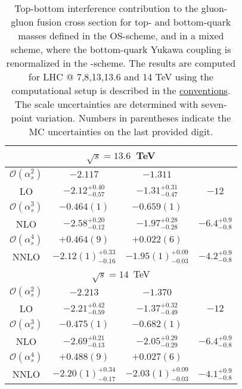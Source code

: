 \begin{table}
\begin{tabular}{cccc}
  \hline
  \hline
  \multicolumn{4}{c}{$\sqrt{s}=13.6$~TeV}\\
  \hline
  $\mathcal{O}(\alpha_s^2)$ & $-2.117$ & $-1.311$ & \\
  LO & $-2.12^{+0.40}_{-0.57}$ & $-1.31^{+0.31}_{-0.47}$ & $-12$ \\
  \hline
  $\mathcal{O}(\alpha_s^3)$ & $-0.464(1)$ & $-0.659(1)$ & \\
  NLO & $-2.58^{+0.20}_{-0.12}$ & $-1.97^{+0.28}_{-0.28}$ & $-6.4^{+0.9}_{-0.8}$ \\
  \hline
  $\mathcal{O}(\alpha_s^4)$ & $+0.464(9)$ & $+0.022(6)$ & \\
  NNLO & $-2.12(1)^{+0.33}_{-0.16}$ & $-1.95(1)^{+0.09}_{-0.03}$ & $-4.2^{+0.9}_{-0.8}$ \\
  \hline
  \hline
  \multicolumn{4}{c}{$\sqrt{s}=14$~TeV}\\
  \hline
  $\mathcal{O}(\alpha_s^2)$ & $-2.213$ & $-1.370$ & \\
  LO & $-2.21^{+0.42}_{-0.59}$ & $-1.37^{+0.32}_{-0.49}$ & $-12$ \\
  \hline
  $\mathcal{O}(\alpha_s^3)$ & $-0.475(1)$ & $-0.682(1)$ & \\
  NLO & $-2.69^{+0.21}_{-0.13}$ & $-2.05^{+0.29}_{-0.29}$ & $-6.4^{+0.9}_{-0.8}$ \\
  \hline
  $\mathcal{O}(\alpha_s^4)$ & $+0.488(9)$ & $+0.027(6)$ & \\
  NNLO & $-2.20(1)^{+0.34}_{-0.17}$ & $-2.03(1)^{+0.09}_{-0.03}$ & $-4.1^{+0.9}_{-0.8}$ \\
  \end{tabular}
  \caption{Top-bottom interference contribution to the gluon-gluon fusion cross section for top- and bottom-quark masses defined in the \acs{OS}-scheme, and in a mixed scheme, where the bottom-quark Yukawa coupling is renormalized in the \MS-scheme. The results are computed for LHC @ 7,8,13,13.6 and 14 TeV using the computational setup is described in the \hyperref[chap:notation_and_conventions]{conventions}. The scale uncertainties are determined with seven-point variation. Numbers in parentheses indicate the \acs{MC} uncertainties on the last provided digit.}
  \label{tab:a3:t-bOS}
\end{table}

